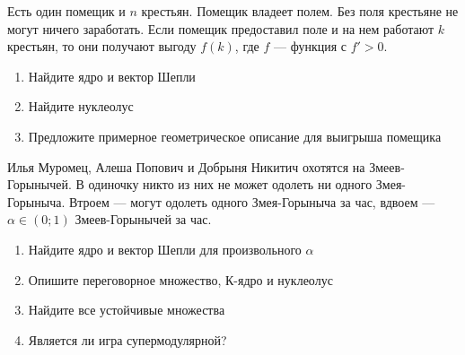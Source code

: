 \begin{problem}

Есть один помещик и $n$ крестьян. Помещик владеет полем. Без поля крестьяне не могут ничего заработать. Если помещик предоставил поле и на нем работают $k$ крестьян, то они получают выгоду $f(k)$, где $f$ --- функция с $f'>0$.
\begin{enumerate}
\item Найдите ядро и вектор Шепли
\item Найдите нуклеолус
\item Предложите примерное геометрическое описание для выигрыша помещика
\end{enumerate}



\begin{sol}

\end{sol}
\end{problem}




\begin{problem}


Илья Муромец, Алеша Попович и Добрыня Никитич охотятся на Змеев-Горынычей. В одиночку никто из них не может одолеть ни одного Змея-Горыныча. Втроем --- могут одолеть одного Змея-Горыныча за час, вдвоем --- $\alpha\in (0;1)$ Змеев-Горынычей за час.
\begin{enumerate}
\item Найдите ядро и вектор Шепли для произвольного $\alpha$
\item Опишите переговорное множество, К-ядро и нуклеолус
\item Найдите все устойчивые множества

\item Является ли игра супермодулярной?
\end{enumerate}



\begin{sol}

\end{sol}
\end{problem}




